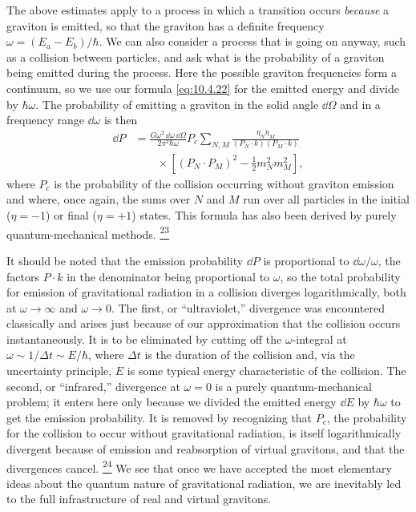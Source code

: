 The above estimates apply to a process in which a transition occurs
\emph{because} a graviton is emitted, so that the graviton has a definite
frequency \(\omega=(E_a-E_b)/\hbar\). We can also consider a process that is
going on anyway, such as a collision between particles, and ask what is the
probability of a graviton being emitted during the process. Here the possible
graviton frequencies form a continuum, so we use our formula
\eqref{eq:10.4.22} for the emitted energy and divide by \(\hbar\omega\).
The probability of emitting a graviton in the solid angle \(\dd\Omega\) and in
a frequency range \(\dd\omega\) is then
\begin{equation}
  \begin{split}
  \dd P
  &=
  \frac{G\omega^2\,\dd\omega\,\dd\Omega}{2\pi^2\hbar\omega}
  P_c
  \sum_{N,M}
  \frac{\eta_N\eta_M}
       {(P_N\cdot k)(P_M\cdot k)}
  \\
  &\qquad\times
  \left[
    (P_N\cdot P_M)^2-\frac12m_N^2m_M^2
  \right],
  \end{split}
  \tag{10.8.8}\label{eq:10.8.8}
\end{equation}
where \(P_c\) is the probability of the collision occurring without graviton
emission and where, once again, the sums over \(N\) and \(M\) run over all
particles in the initial (\(\eta=-1\)) or final (\(\eta=+1\)) states.
This formula has also been derived by purely quantum-mechanical methods.%
\hyperref[ch10-ref-23]{\textsuperscript{23}}

It should be noted that the emission probability \(\dd P\) is proportional to
\(\dd\omega/\omega\), the factors \(P\cdot k\) in the denominator being
proportional to \(\omega\), so the total probability for emission of
gravitational radiation in a collision diverges logarithmically, both at
\(\omega\to\infty\) and \(\omega\to0\). The first, or ``ultraviolet,''
divergence was encountered classically and arises just because of our
approximation that the collision occurs instantaneously. It is to be
eliminated by cutting off the \(\omega\)-integral at
\(\omega\sim1/\Delta t\sim E/\hbar\), where \(\Delta t\) is the duration
of the collision and, via the uncertainty principle, \(E\) is some typical
energy characteristic of the collision. The second, or ``infrared,''
divergence at \(\omega=0\) is a purely quantum-mechanical problem; it enters
here only because we divided the emitted energy \(\dd E\) by \(\hbar\omega\)
to get the emission probability. It is removed by recognizing that \(P_c\),
the probability for the collision to occur without gravitational radiation,
is itself logarithmically divergent because of emission and reabsorption of
virtual gravitons, and that the divergences cancel.%
\hyperref[ch10-ref-24]{\textsuperscript{24}}
We see that once we have accepted the most elementary ideas about the quantum
nature of gravitational radiation, we are inevitably led to the full
infrastructure of real and virtual gravitons.

